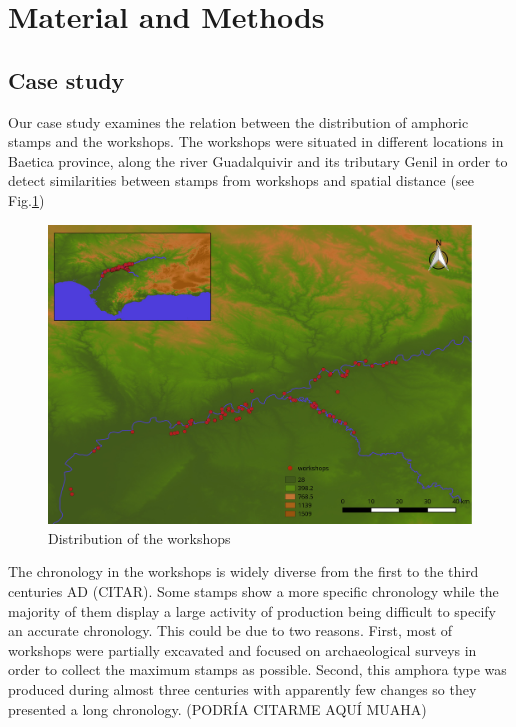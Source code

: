 \documentclass[review]{elsarticle}
\begin{document}




\section{Material and Methods}

\subsection{Case study}

Our case study examines the relation between the distribution of amphoric stamps and the workshops. The workshops were situated in different locations in Baetica province, along the river Guadalquivir and its tributary Genil in order to detect similarities between stamps from workshops and spatial distance (see Fig.\ref{workshop})


\begin{figure}[htp]
	\centering
\includegraphics[width=\linewidth]{figs/workshop}
\caption{Distribution of the workshops}
\label{workshop}
\end{figure} 



The chronology in the workshops is widely diverse from the first to the third centuries AD (CITAR). Some stamps show a more specific chronology while the majority of them display a large activity of production being difficult to specify an accurate chronology. This could be due to two reasons. First, most of workshops were partially excavated and focused on archaeological surveys in order to collect the maximum stamps as possible. Second, this amphora type was produced during almost three centuries with apparently few changes so they presented a long chronology. (PODRÍA CITARME AQUÍ MUAHA)
 
\end{document}
